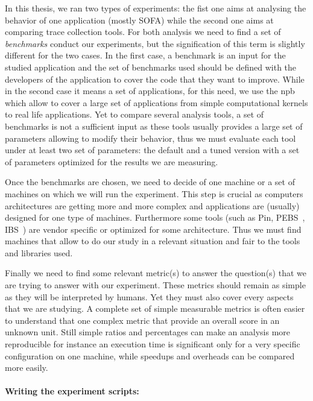 In this thesis, we ran two types of experiments: the fist one aims at
analysing the behavior of one application (mostly \gls{SOFA}) while the second
one aims at comparing trace collection tools. For both analysis we need to
find a set of \emph{benchmarks} conduct our experiments, but the signification
of this term is slightly different for the two cases. In the first case, a
benchmark is an input for the studied application and the set of benchmarks
used should be defined with the developers of the application to cover the
code that they want to improve. While in the second case it means a set of
applications, for this need, we use the \gls{npb}~\cite{Jin1999} which allow
to cover a large set of applications from simple computational kernels to real
life applications. Yet to compare several analysis tools, a set of benchmarks
is not a sufficient input as these tools usually provides a large set of
parameters allowing to modify their behavior, thus we must evaluate each tool
under at least two set of parameters: the default and a tuned version with a
set of parameters optimized for the results we are measuring.

Once the benchmarks are chosen, we need to decide of one machine or a set of
machines on which we will run the experiment. This step is crucial as
computers architectures are getting more and more complex  and applications are (usually) designed for one type of machines.
Furthermore some tools (such as \gls{Pin}, \gls{PEBS}~\cite{Levinthal2009}, \gls{IBS}~\cite{Drongowski07Instructionbased}) are vendor
specific or optimized for some architecture. Thus we must find machines that
allow to do our study in a relevant situation and fair to the tools and
libraries used.

Finally we need to find some relevant metric(s) to answer the question(s) that we
are trying to answer with our experiment. These metrics should remain as
simple as they will be interpreted by humans. Yet they must also cover every
aspects that we are studying. A complete set of simple measurable metrics is
often easier to understand that one complex metric that provide an overall
score in an unknown unit. Still simple ratios and percentages can make an
analysis more reproducible for instance an execution time is significant only
for a very specific configuration on one machine, while speedups and overheads
can be compared more easily.


\paragraph{Writing the experiment scripts:}

